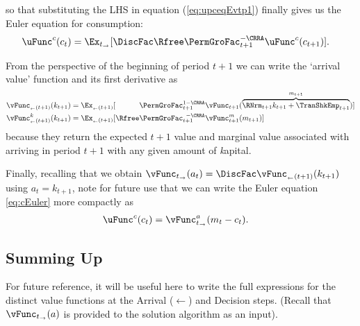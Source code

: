 so that substituting the LHS in equation (\ref{eq:upceqEvtp1}) finally gives us the Euler equation for consumption:
  \begin{equation}\begin{gathered}\begin{aligned}
        \uFunc^{{c}}({c}_{t})  & = \Ex_{t_\rightarrow}[\DiscFac\Rfree \PermGroFac_{t+1}^{-\CRRA}\uFunc^{{c}}({c}_{t+1})] \label{eq:cEuler}.
      \end{aligned}\end{gathered}\end{equation}

From the perspective of the beginning of {period} $t+1$ we can write the `arrival value' function and its first derivative as
  \begin{equation}\begin{gathered}\begin{aligned}
        \vFunc_{_\leftarrow{(t+1)}}({k}_{t+1})    & = \Ex_{_\leftarrow{(t+1)}}[\phantom{\Rfree}\PermGroFac_{t+1}^{1-\CRRA}{\vFunc}_{{t+1}}(\overbrace{\RNrm_{t+1}{k}_{t+1}+{\TranShkEmp}_{t+1}}^{{m}_{t+1}})] \label{eq:vFuncBegtpdefn} \\
        {\vFunc^{{k}}_{_\leftarrow{(t+1)}}}({k}_{t+1}) & = \Ex_{_\leftarrow{(t+1)}}[\Rfree \PermGroFac_{t+1}^{\phantom{1}-\CRRA} {\vFunc}_{{t+1}}^{{m}}({m}_{t+1})]
      \end{aligned}\end{gathered}\end{equation}
because they return the expected $t+1$ value and marginal value associated with arriving in {period} $t+1$ with any given amount of \textit{k}apital.

Finally, recalling that we obtain $\vFunc_{t_\rightarrow}({a}_{t}) = \DiscFac \vFunc_{_\leftarrow{(t+1)}}({k}_{t+1})$ using ${a}_{t} = {k}_{t+1}$, note for future use that we can write the Euler equation \eqref{eq:cEuler} more compactly as
  \begin{equation}\begin{gathered}\begin{aligned}
        \uFunc^{{c}}({c}_{t})   & = \vFunc_{t_\rightarrow}^{{a}}({m}_{t}-{c}_{t}).
        \label{eq:upEqbetaOp}
      \end{aligned}\end{gathered}\end{equation}


\hypertarget{summing-up}{}
\subsection{Summing Up}\label{subsec:summing-up}
For future reference, it will be useful here to write the full expressions for the distinct value functions at the {Arrival} ($\leftarrow$) and {Decision} steps.  (Recall that $\vFunc_{t_\rightarrow}(a)$ is provided to the solution algorithm as an input).

